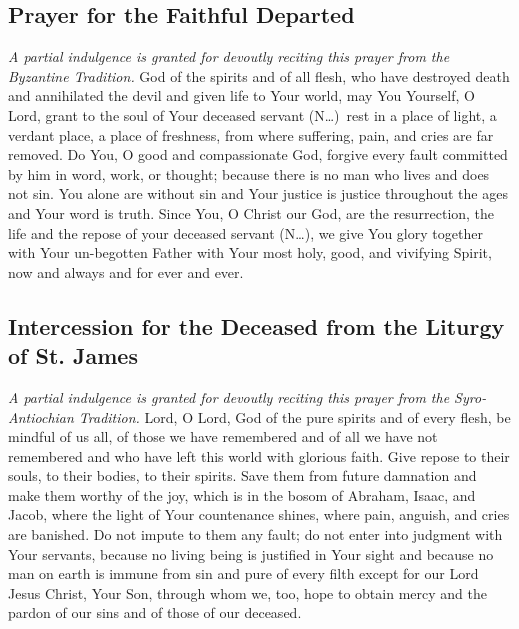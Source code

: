 \documentclass[12pt]{article}
\newcommand{\prayertitle}[1]{\subsection{#1}}
\newcommand{\indulgencedprayertitle}[1]{\prayertitle{#1 \protect\kreuz}}
\newcommand{\insertname}{(N\dots)}
\newcommand{\note}[1]{{\small{\textsl{#1}}}\newline}
\begin{document}
\indulgencedprayertitle{Prayer for the Faithful Departed}
\note{A partial indulgence is granted for devoutly reciting this prayer from the Byzantine Tradition.}
God of the spirits and of all flesh, who have destroyed death and annihilated the devil
and given life to Your world, may You Yourself, O Lord, grant to the soul of Your
deceased servant \insertname\ rest in a place of light, a verdant place, a place of freshness, from where suffering, pain, and cries are far removed.
Do You, O good and compassionate God, forgive every fault committed by him in word, work, or thought;
because there is no man who lives and does not sin.
You alone are without sin and Your justice is justice throughout the ages and Your word is truth.
Since You, O Christ our God, are the resurrection, the life and the repose of your
deceased servant \insertname, we give You glory together with Your un-begotten Father with
Your most holy, good, and vivifying Spirit, now and always and for ever and ever.
\newpage
\indulgencedprayertitle{Intercession for the Deceased from the Liturgy of St. James}
\note{A partial indulgence is granted for devoutly reciting this prayer from the Syro-Antiochian Tradition.}
Lord, O Lord, God of the pure spirits and of every flesh, be mindful of us all, of those we have remembered and of all we have not remembered and who have left this world with glorious faith.
Give repose to their souls, to their bodies, to their spirits.
Save them from future damnation and make them worthy of the joy, which is in the bosom of Abraham, Isaac, and Jacob, where the light of Your countenance shines, where pain, anguish, and cries are banished.
Do not impute to them any fault;
do not enter into judgment with Your servants, because no living being is justified in Your sight and because no man on earth is immune from sin and pure of every filth except for our Lord Jesus Christ, Your Son, through whom we, too, hope to obtain mercy and the pardon of our sins and of those of our deceased.
\end{document}
